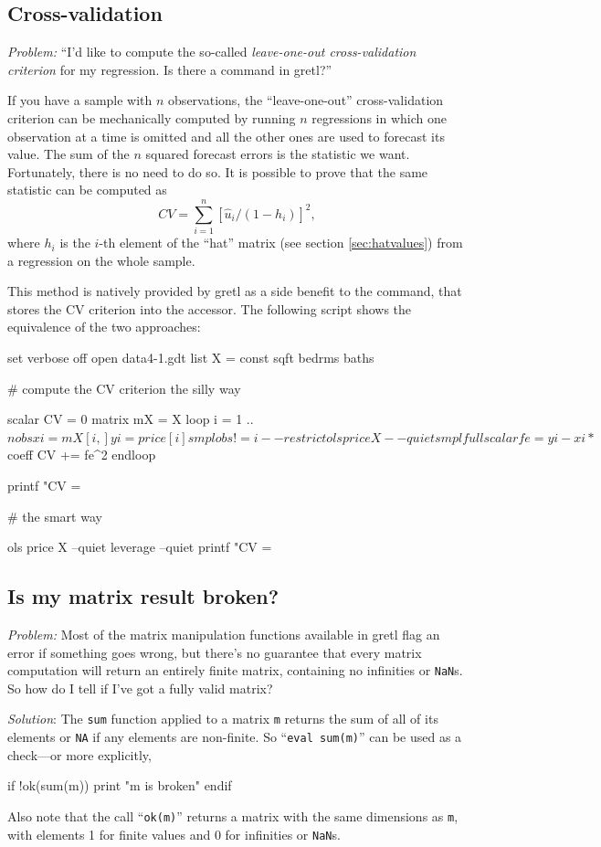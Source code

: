 \subsection{Cross-validation}
\label{sec:xvalid}

\emph{Problem:} ``I'd like to compute the so-called \emph{leave-one-out
cross-validation criterion} for my regression. Is there a command in
gretl?''

If you have a sample with $n$ observations, the ``leave-one-out''
cross-validation criterion can be mechanically computed by running $n$
regressions in which one observation at a time is omitted and all the
other ones are used to forecast its value. The sum of the $n$ squared
forecast errors is the statistic we want. Fortunately, there is no
need to do so. It is possible to prove that the same statistic can be
computed as
\[
CV = \sum_{i=1}^n [\hat{u}_{i}/(1-h_{i})]^2,
\]
where $h_i$ is the $i$-th element of the ``hat'' matrix (see section
\ref{sec:hatvalues}) from a regression on the whole sample.

This method is natively provided by gretl as a side benefit to the
 command, that stores the CV criterion into the
 accessor. The following script shows the equivalence of
the two approaches:
\begin{code}
set verbose off
open data4-1.gdt
list X = const sqft bedrms baths

# compute the CV criterion the silly way

scalar CV = 0
matrix mX = {X}
loop i = 1 .. $nobs
    xi = mX[i,]
    yi = price[i]
    smpl obs != i --restrict
    ols price X --quiet
    smpl full
    scalar fe = yi - xi * $coeff
    CV += fe^2
endloop

printf "CV = %

# the smart way

ols price X --quiet
leverage --quiet
printf "CV = %
\end{code}

\subsection{Is my matrix result broken?}
\label{sec:brokenmat}

\emph{Problem:} Most of the matrix manipulation functions available
in gretl flag an error if something goes wrong, but there's no
guarantee that every matrix computation will return an entirely finite
matrix, containing no infinities or \texttt{NaN}s. So how do I tell if
I've got a fully valid matrix?

\emph{Solution}: The \texttt{sum} function applied to a matrix
\texttt{m} returns the sum of all of its elements or \texttt{NA} if
any elements are non-finite. So ``\texttt{eval sum(m)}'' can be used
as a check---or more explicitly,
\begin{code}
if !ok(sum(m))
    print "m is broken"
endif
\end{code}
Also note that the call ``\texttt{ok(m)}'' returns a matrix with the
same dimensions as \texttt{m}, with elements 1 for finite values and 0
for infinities or \texttt{NaN}s.

